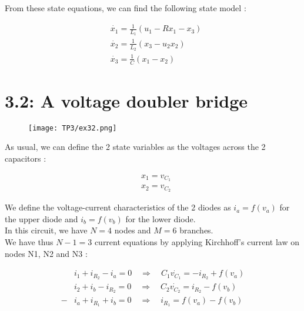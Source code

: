 From these state equations, we can find the following state model :


\begin{equation}
\begin{split}
&\dot{x_1} = \frac{1}{L_1} (u_1 - Rx_1-x_3)\\
&\dot{x_2} = \frac{1}{L_2} (x_3-u_2x_2)\\
&\dot{x_3} = \frac{1}{C} (x_1-x_2)
\end{split}
\end{equation}

\newpage

\section*{3.2: A voltage doubler bridge}

\begin{figure}[htbp]
\begin{center}
\texttt{[image: TP3/ex32.png]}
\end{center}
\end{figure}

As usual, we can define the 2 state variables as the voltages across the 2 capacitors :

\begin{equation}
\begin{split}
&x_1 = v_{C_1}\\
&x_2=v_{C_2}
\end{split} 
\end{equation}

We define the voltage-current characteristics of the 2 diodes as $i_a=f(v_a)$ for the upper diode and $i_b=f(v_b)$ for the lower diode.\\

In this circuit, we have $N=4$ nodes and $M=6$ branches.\\

We have thus $N-1=3$ current equations by applying Kirchhoff's current law on nodes N1, N2 and N3 :

\begin{align}
\label{t1}
&i_1+i_{R_2}-i_a = 0 \quad \Rightarrow \quad C_1\dot{v_{C_1}} = -i_{R_2}+f(v_a)\\
\label{t2}
&i_2+i_b-i_{R_2} = 0 \quad \Rightarrow\quad C_2\dot{v_{C_2}} = i_{R_2}-f(v_b)\\
\label{t4}
-&i_a+i_{R_1}+i_b = 0 \quad \Rightarrow \quad i_{R_1} = f(v_a)-f(v_b)
\end{align}


